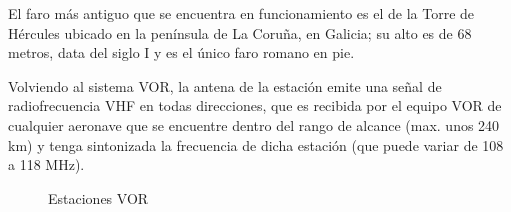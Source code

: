 El faro más antiguo que se encuentra en funcionamiento es el de la Torre de Hércules ubicado en la península de La Coruña, en Galicia; su alto es de 68 metros, data del siglo I y es el único faro romano en pie.

Volviendo al sistema VOR, la antena de la estaci\'on emite una se\~nal de radiofrecuencia VHF en todas direcciones, que es recibida por el equipo VOR de cualquier aeronave que se encuentre dentro del rango de alcance (max. unos 240 km) y tenga sintonizada la frecuencia de dicha estaci\'on (que puede variar de 108 a 118 MHz).

\begin{figure}[!b]
 \centering
 \caption{Estaciones VOR }
\end{figure}


